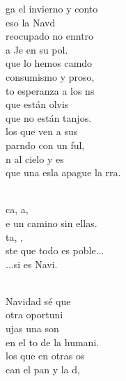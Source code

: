 \begin{cancion}%
	ga el invierno y conto \\
	eso la Navd\\
	reocupado no enntro \\
	a Je en su pol. \\
	que lo hemos camdo \\
	 consumismo  y proso,\\
	to esperanza a los ns\\
	que están olvis\\
	que no están tanjos. \\
	los que ven a sus \\
	parndo con un ful,\\
	n al cielo y es \\
	que una esla apague la rra.\\\jump\\
	\begin{chorus}%
	ca, a, \\
	e un camino sin ellas. \\
	ta, , \\
	ste que todo es poble...\\
	...si es Navi. \\
	\end{chorus}%
	\jump\\
	Navidad sé que \\
	 otra oportuni\\
	ujas una son\\
	en el to de la humani.\\
	los que en otras os\\
	can el pan y la d, \\

\end{cancion}
